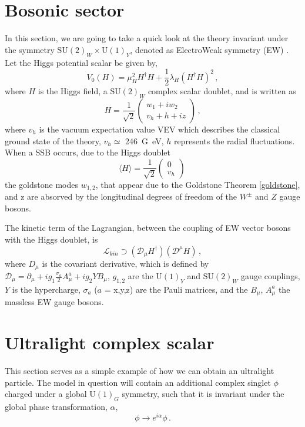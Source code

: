 \section{Bosonic sector}

In this section, we are going to take a quick look at the theory invariant under the symmetry $\textrm{SU}(2)_W \times  \textrm{U}(1)_Y$, denoted as ElectroWeak symmetry (EW) \cite{grif} \cite{Freitas_2021}.
Let the Higgs potential scalar be given by,
\begin{equation}
	V_0(H)=\mu_{H}^{2}H^{\dag}H+\frac{1}{2}\lambda_H(H^{\dag}H)^2\,,
\end{equation}
where $H$ is the Higgs field, a SU$(2)_W$ complex scalar doublet, and is written as
\begin{equation}
	H=\frac{1}{\sqrt{2}}
	\left(\begin{array}{c} w_1+iw_2 \\ v_h+h+iz \end{array} \right)\,,
\end{equation}
where $v_h$ is the vacuum expectation value VEV which describes the classical ground state of the theory, $v_h\simeq$ \SI{246}{G\eV}, $h$ represents the radial fluctuations. When a SSB occurs, due to the Higgs doublet 
\begin{equation}
	\langle H \rangle = \frac{1}{\sqrt{2}}\left(
	\begin{array}{c}
	0 \\
	v_h
	\end{array}\right)\,
\end{equation}
the goldstone modes $w_{1,2}$, that appear due to the Goldstone Theorem \ref{goldstone}, and z are absorved by the longitudinal degrees of freedom of the $W^{\pm}$ and $Z$ gauge bosons.

The kinetic term of the Lagrangian, between the coupling of EW vector bosons with the Higgs doublet, is
\begin{equation}
	\mathcal{L}_{kin}\supset(\mathcal{D}_\mu H^\dag) (\mathcal{D}^\mu H)\,,
\end{equation}
where $D_\mu$ is the covariant derivative, which is defined by
$\mathcal{D}_\mu=\partial_\mu+ig_1\frac{\sigma_a}{2}A_\mu^a+ig_2YB_\mu 
$, $g_{1,2}$ are the U$(1)_Y$ and SU$(2)_W$ gauge couplings, $Y$ is the hypercharge, $\sigma_a$ ($a$ = x,y,z) are the Pauli matrices, and the $B_\mu$, $A_\mu^a$ the massless EW gauge bosons.

\section{Ultralight complex scalar}
This section serves as a simple example of how we can obtain an ultralight particle.
The model in question will contain an additional complex singlet $\phi$ charged under a global U$(1)_G$ symmetry, such that it is invariant under the global phase transformation, $\alpha$, \cite{Freitas_2021}
\begin{equation}
	\phi \rightarrow e^{i\alpha}\phi\,.
\end{equation}

